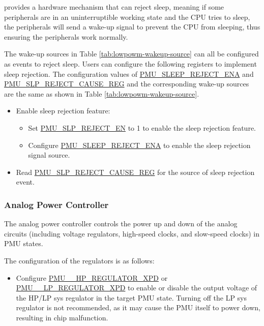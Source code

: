 \documentclass[main\_\_EN.tex]{subfiles}
\begin{document}
\chipname{} provides a hardware mechanism that can reject sleep, meaning if some peripherals are in an uninterruptible working state and the CPU tries to sleep, the peripherals will send a wake-up signal to prevent the CPU from sleeping, thus ensuring the peripherals work normally.

The wake-up sources in Table \ref{tab:lowpowm-wakeup-source} can all be configured as events to reject sleep. Users can configure the following registers to implement sleep rejection. The configuration values of \hyperref[fielddesc:PMUSLEEPREJECTENA]{PMU\_SLEEP\_REJECT\_ENA} and \hyperref[fielddesc:PMUREJECTCAUSE]{PMU\_SLP\_REJECT\_CAUSE\_REG} and the corresponding wake-up sources are the same as shown in Table \ref{tab:lowpowm-wakeup-source}.

\begin{itemize}
    \item Enable sleep rejection feature:
    \begin{itemize}
        \item Set \hyperref[fielddesc:PMUSLPREJECTEN]{PMU\_SLP\_REJECT\_EN} to 1 to enable the sleep rejection feature.
        \item Configure \hyperref[fielddesc:PMUSLEEPREJECTENA]{PMU\_SLEEP\_REJECT\_ENA} to enable the sleep rejection signal source.
    \end{itemize}
    \item Read \hyperref[fielddesc:PMUREJECTCAUSE]{PMU\_SLP\_REJECT\_CAUSE\_REG} for the source of sleep rejection event.
\end{itemize}

\subsubsection{Analog Power Controller}\label{sec:lowpowm_analog_power_controller}

The analog power controller controls the power up and down of the analog circuits (including voltage regulators, high-speed clocks, and slow-speed clocks) in PMU states.

The configuration of the regulators is as follows:

\begin{itemize}
    \item Configure \hyperref[fielddesc:PMUHPACTIVEHPREGULATORXPD]{PMU\_\_HP\_REGULATOR\_XPD} or \hyperref[fielddesc:PMUHPSLEEPLPREGULATORXPD]{PMU\_\_LP\_REGULATOR\_XPD} to enable or disable the output voltage of the HP/LP sys regulator in the target PMU state. Turning off the LP sys regulator is not recommended, as it may cause the PMU itself to power down, resulting in chip malfunction.
\end{itemize}
\end{document}
